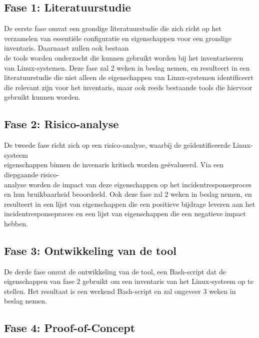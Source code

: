 \subsection{Fase 1: Literatuurstudie}%
\label{sub:literatuurstudie}

De eerste fase omvat een grondige literatuurstudie die zich richt op het verzamelen van essenti\"ele configuratie en eigenschappen voor een grondige inventaris.
Daarnaast zullen ook bestaan\\de tools worden onderzocht die kunnen gebruikt worden bij het inventariseren van Linux-systemen.
Deze fase zal 2 weken in beslag nemen, en resulteert in een literatuurstudie die niet alleen de  eigenschappen van Linux-systemen identificeert die relevant zijn voor het inventaris, maar ook reeds bestaande tools die hiervoor gebruikt kunnen worden.

\subsection{Fase 2: Risico-analyse}%
\label{sub:risico_analyse}

De tweede fase richt zich op een risico-analyse, waarbij de ge\"identificeerde Linux-systeem\\eigenschappen binnen de invenaris kritisch worden ge\"evalueerd.
Via een diepgaande risico-\\analyse worden de impact van deze eigenschappen op het incidentresponseproces en hun bruikbaarheid beoordeeld.
Ook deze fase zal 2 weken in beslag nemen, en resulteert in een lijst van eigenschappen die een positieve bijdrage leveren aan het incidentresponseproces en een lijst van eigenschappen die een negatieve impact hebben.

\subsection{Fase 3: Ontwikkeling van de tool}%
\label{sub:ontwikkeling_van_de_tool}

De derde fase omvat de ontwikkeling van de tool, een Bash-script dat de eigenschappen van fase 2 gebruikt om een inventaris van het Linux-systeem op te stellen.
Het resultaat is een werkend Bash-script en zal ongeveer 3 weken in beslag nemen.

\subsection{Fase 4: Proof-of-Concept}%
\label{sub:proof_of_concept}

